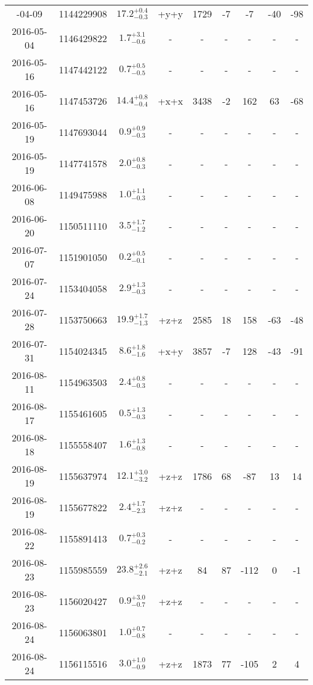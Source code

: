 \begin{longtable}{|c|c|c|c|c|c|c|c|c|}
		\hline
		\endlastfoot
	2016-04-09 & 1144229908 & $17.2^{+0.4}_{-0.3}$ & +y+y & 1729 & -7 & -7 & -40 & -98 \\
	2016-05-04 & 1146429822 & $ 1.7^{+3.1}_{-0.6}$ & - & - & - & - & - & - \\
	2016-05-16 & 1147442122 & $ 0.7^{+0.5}_{-0.5}$ & - & - & - & - & - & - \\
	2016-05-16 & 1147453726 & $14.4^{+0.8}_{-0.4}$ & +x+x & 3438 & -2 & 162 & 63 & -68 \\
	2016-05-19 & 1147693044 & $ 0.9^{+0.9}_{-0.3}$ & - & - & - & - & - & - \\
	2016-05-19 & 1147741578 & $ 2.0^{+0.8}_{-0.3}$ & - & - & - & - & - & - \\
	2016-06-08 & 1149475988 & $ 1.0^{+1.1}_{-0.3}$ & - & - & - & - & - & - \\
	2016-06-20 & 1150511110 & $ 3.5^{+1.7}_{-1.2}$ & - & - & - & - & - & - \\
	2016-07-07 & 1151901050 & $ 0.2^{+0.5}_{-0.1}$ & - & - & - & - & - & - \\
	2016-07-24 & 1153404058 & $ 2.9^{+1.3}_{-0.3}$ & - & - & - & - & - & - \\
	2016-07-28 & 1153750663 & $19.9^{+1.7}_{-1.3}$ & +z+z & 2585 & 18 & 158 & -63 & -48 \\
	2016-07-31 & 1154024345 & $ 8.6^{+1.8}_{-1.6}$ & +x+y & 3857 & -7 & 128 & -43 & -91 \\
	2016-08-11 & 1154963503 & $ 2.4^{+0.8}_{-0.3}$ & - & - & - & - & - & - \\
	2016-08-17 & 1155461605 & $ 0.5^{+1.3}_{-0.3}$ & - & - & - & - & - & - \\
	2016-08-18 & 1155558407 & $ 1.6^{+1.3}_{-0.8}$ & - & - & - & - & - & - \\
	2016-08-19 & 1155637974 & $12.1^{+3.0}_{-3.2}$ & +z+z & 1786 & 68 & -87 & 13 & 14 \\
	2016-08-19 & 1155677822 & $ 2.4^{+1.7}_{-2.3}$ & +z+z & - & - & - & - & - \\
	2016-08-22 & 1155891413 & $ 0.7^{+0.3}_{-0.2}$ & - & - & - & - & - & - \\
	2016-08-23 & 1155985559 & $23.8^{+2.6}_{-2.1}$ & +z+z & 84 & 87 & -112 & 0 & -1 \\
	2016-08-23 & 1156020427 & $ 0.9^{+3.0}_{-0.7}$ & +z+z & - & - & - & - & - \\
	2016-08-24 & 1156063801 & $ 1.0^{+0.7}_{-0.8}$ & - & - & - & - & - & - \\
	2016-08-24 & 1156115516 & $ 3.0^{+1.0}_{-0.9}$ & +z+z & 1873 & 77 & -105 & 2 & 4 \\

\end{longtable}

